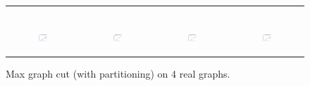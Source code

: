 \begin{figure}[ht]
\begin{tabular}{cccc}
\begin{subfigure}[b]{0.22\textwidth}
			\caption{}
			\label{appfig:partition:diffFA_CF2G_it2004_maxgraphcut}
	  \end{subfigure} \\
	  \begin{subfigure}[b]{0.22\textwidth}
	  	\includegraphics[width=110pt]{images_partition/validated_CC2G_friendster_maxgraphcut.eps}
			\caption{}
			\label{appfig:partition:validated_CC2G_friendster_maxgraphcut}
	  \end{subfigure} &
	  \begin{subfigure}[b]{0.22\textwidth}
	  	\includegraphics[width=110pt]{images_partition/validated_CC2G_arabic2005_maxgraphcut.eps}
			\caption{}
			\label{appfig:partition:validated_CC2G_arabic2005_maxgraphcut}
	  \end{subfigure} &
	  \begin{subfigure}[b]{0.22\textwidth}
	  	\includegraphics[width=110pt]{images_partition/validated_CC2G_uk2005_maxgraphcut.eps}
			\caption{}
			\label{appfig:partition:validated_CC2G_uk2005_maxgraphcut}
	  \end{subfigure} &
	  \begin{subfigure}[b]{0.22\textwidth}
	  	\includegraphics[width=110pt]{images_partition/validated_CC2G_it2004_maxgraphcut.eps}
			\caption{}
			\label{appfig:partition:validated_CC2G_it2004_maxgraphcut}
	  \end{subfigure} \\
  \end{tabular}
  \caption{Max graph cut (with partitioning) on 4 real graphs.}
\end{figure}





